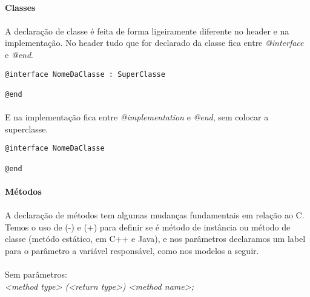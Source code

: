 \documentclass[a4paper,12pt,brazil,doubleside]{book}
\begin{document}
\bigskip 

\paragraph{}\textbf{Classes}

\paragraph{}A declaração de classe é feita de forma ligeiramente diferente no header e na implementação. No header tudo que for declarado da classe fica entre \textit{@interface} e \textit{@end}.

\begin{lstlisting}
@interface NomeDaClasse : SuperClasse

@end
\end{lstlisting}

\paragraph{}E na implementação fica entre \textit{@implementation
} e \textit{@end}, sem colocar a superclasse.

\begin{lstlisting}
@interface NomeDaClasse

@end
\end{lstlisting}

\bigskip 

\paragraph{}\textbf{Métodos}

\paragraph{}A declaração de métodos tem algumas mudanças fundamentais em relação ao C. Temos o uso de (-) e (+) para definir se é método de instância ou método de classe (metódo estático, em C++ e Java), e nos parâmetros declaramos um label para o parâmetro a variável responsável, como nos modelos a seguir.\\

\paragraph{}Sem parâmetros:\\
\emph{<method type> (<return type>) <method name>;}\\
\end{document}
